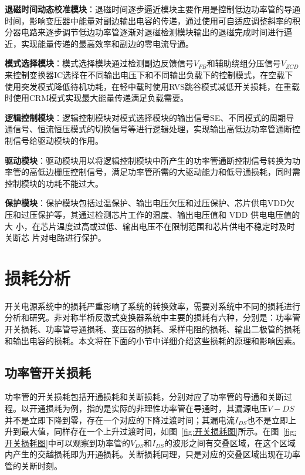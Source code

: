 \textbf{退磁时间动态校准模块}：退磁时间逐步逼近模块主要作用是控制低边功率管的导通时间，影响变压器中能量对副边输出电容的传递，通过使用可自适应调整斜率的积分器电路来逐步调节低边功率管逐渐对退磁检测模块输出的退磁完成时间进行逼近，实现能量传递的最高效率和副边的零电流导通。

\textbf{模式选择模块}：模式选择模块通过检测副边反馈信号$V_{FB}$和辅助绕组分压信号$V_{ZCD}$来控制变换器IC选择在不同输出电压下和不同输出负载下的控制模式，在空载下使用突发模式降低待机功耗，在轻中载时使用RVS跳谷模式减低开关损耗，在重载时使用CRM模式实现最大能量传递满足负载需要。

\textbf{逻辑控制模块}：逻辑控制模块对模式选择模块的输出信号SE、不同模式的周期导通信号、恒流恒压模式的切换信号等进行逻辑处理，实现输出高低边功率管通断控制信号给驱动模块的作用。

\textbf{驱动模块}：驱动模块用以将逻辑控制模块中所产生的功率管通断控制信号转换为功率管的高低边栅压控制信号，满足功率管所需的大驱动能力和低导通损耗，同时需控制模块的功耗不能过大。

\textbf{保护模块}：保护模块包括过温保护、输出电压欠压和过压保护、芯片供电VDD欠压和过压保护等，其通过检测芯片工作的温度、输出电压值和 VDD 供电电压值的大 小，在芯片温度过高或过低、输出电压不在限制范围和芯片供电不稳定时及时关断芯 片对电路进行保护。

\section{损耗分析}

开关电源系统中的损耗严重影响了系统的转换效率，需要对系统中不同的损耗进行分析和研究。非对称半桥反激式变换器系统中主要的损耗有六种，分别是：功率管开关损耗、功率管导通损耗、变压器的损耗、采样电阻的损耗、输出二极管的损耗和输出电容的损耗。本文将在下面的小节中详细介绍这些损耗的原理和影响因素。

\subsection{功率管开关损耗}

功率管的开关损耗包括开通损耗和关断损耗，分别对应了功率管的导通和关断过程。以开通损耗为例，指的是实际的非理性功率管在导通时，其漏源电压$V-{DS}$并不是立即下降到零，存在一个对应的下降过渡时间；其漏电流$I_{DS}$也不是立即上升到最大值，同样存在一个上升过渡时间，如图~\ref{fig:开关损耗图}所示。在图~\ref{fig:开关损耗图}中可以观察到功率管的$V_{DS}$和$I_{DS}$的波形之间有交叠区域，在这个区域内产生的交越损耗即为开通损耗。关断损耗同理，只是对应的交叠区域出现在功率管的关断时刻。


